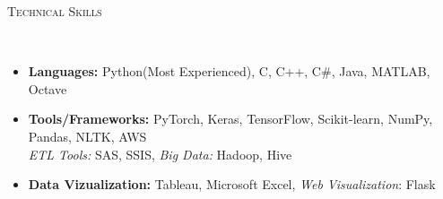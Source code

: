 \documentclass[9pt]{article}
\newenvironment{changemargin}[2]{%
  \begin{list}{}{%
    \setlength{\topsep}{0pt}%
    \setlength{\leftmargin}{0pt}%
    \setlength{\rightmargin}{#2}%
    \setlength{\listparindent}{\parindent}%
    \setlength{\itemindent}{\parindent}%
    \setlength{\parsep}{\parskip}%
  }%
  \item[]}{\end{list}
}
\newcommand{\lineover}{
	\begin{changemargin}{-0.05in}{-0.05in}
		\vspace*{-8pt}
		\hrulefill \\
		\vspace*{-2pt}
	\end{changemargin}
}
\newcommand{\header}[1]{
	\begin{changemargin}{-0.5in}{-0.5in}
		\scshape{#1}\\
  	\lineover
	\end{changemargin}
}
\newenvironment{body} {
	\vspace*{-16pt}
	\begin{changemargin}{-0.25in}{-0.5in}
  }	
	{\end{changemargin}
}
\begin{document}

\newpage{}
\header{Technical Skills}

\begin{body}
	\vspace{14pt}
        \begin{itemize} \itemsep -0pt
        
\item \textbf{Languages: }  Python(Most Experienced), C, C++, C\#, Java, MATLAB, Octave
\item \textbf{Tools/Frameworks: } PyTorch, Keras, TensorFlow, Scikit-learn, NumPy, Pandas, NLTK, AWS \\ \emph{ETL Tools:} SAS, SSIS, \emph{Big Data:} Hadoop, Hive 
 \item  \textbf{Data Vizualization: }  Tableau, Microsoft  Excel, \emph{Web Visualization}: Flask	
	    \end{itemize}
        \medskip
\end{body}



          


 
\end{document}
